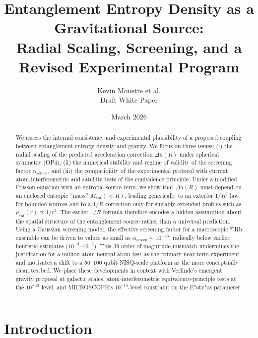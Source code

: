 \documentclass[11pt]{article}
\begin{document}
\title{Entanglement Entropy Density as a Gravitational Source:\\Radial Scaling, Screening, and a Revised Experimental Program}
\author{Kevin Monette et al.\\Draft White Paper}
\date{March 2026}
\maketitle

\begin{abstract}
We assess the internal consistency and experimental plausibility of a proposed coupling between entanglement entropy density and gravity. We focus on three issues: (i) the radial scaling of the predicted acceleration correction $\Delta a(R)$ under spherical symmetry (OP4), (ii) the numerical stability and regime of validity of the screening factor $\alpha_{\text{screen}}$, and (iii) the compatibility of the experimental protocol with current atom-interferometric and satellite tests of the equivalence principle. Under a modified Poisson equation with an entropic source term, we show that $\Delta a(R)$ must depend on an enclosed entropic ``mass'' $M_{\text{ent}}(<R)$, leading generically to an exterior $1/R^2$ law for bounded sources and to a $1/R$ correction only for suitably extended profiles such as $\rho_{\text{ent}}(r)\propto 1/r^2$. The earlier $1/R$ formula therefore encodes a hidden assumption about the spatial structure of the entanglement source rather than a universal prediction. Using a Gaussian screening model, the effective screening factor for a macroscopic $^{87}$Rb ensemble can be driven to values as small as $\alpha_{\text{screen}}\sim 10^{-43}$, radically below earlier heuristic estimates ($10^{-4}$--$10^{-2}$). This 39-order-of-magnitude mismatch undermines the justification for a million-atom neutral-atom test as the primary near-term experiment and motivates a shift to a 50--100 qubit NISQ-scale platform as the more conceptually clean testbed. We place these developments in context with Verlinde's emergent gravity proposal at galactic scales, atom-interferometric equivalence-principle tests at the $10^{-12}$ level, and MICROSCOPE's $10^{-15}$-level constraint on the E"otv"os parameter.
\end{abstract}

\section{Introduction}
\end{document}
